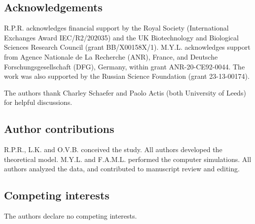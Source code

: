 \documentclass[12pt, a4paper]{article}
\begin{document}
\subsection*{Acknowledgements}

R.P.R. acknowledges financial support by the Royal Society (International Exchanges Award IEC/R2/202035) and the UK Biotechnology and Biological
Sciences Research Council (grant BB/X00158X/1).
M.Y.L. acknowledges support from Agence Nationale de La Recherche (ANR), France, and Deutsche Forschungsgesellschaft (DFG), Germany, within grant  ANR-20-CE92-0044. The work was also supported by the Russian Science Foundation (grant 23-13-00174).

The authors thank Charley Schaefer and Paolo Actis (both University of Leeds) for helpful discussions.

\subsection*{Author contributions}

R.P.R., L.K. and O.V.B. conceived the study.
All authors developed the theoretical model.
M.Y.L. and F.A.M.L. performed the computer simulations.
All authors analyzed the data, and contributed to manuscript review and editing.


\subsection*{Competing interests}

The authors declare no competing interests.
\end{document}
